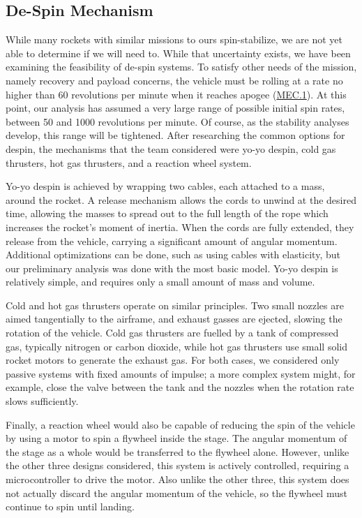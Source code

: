 \subsection{De-Spin Mechanism}
While many rockets with similar missions to ours spin-stabilize, we are not yet able to determine if we will need to. While that uncertainty exists, we have been examining the feasibility of de-spin systems. To satisfy other needs of the mission, namely recovery and payload concerns, the vehicle must be rolling at a rate no higher than 60 revolutions per minute when it reaches apogee (\hyperlink{MEC.1}{MEC.1}). At this point, our analysis has assumed a very large range of possible initial spin rates, between 50 and 1000 revolutions per minute. Of course, as the stability analyses develop, this range will be tightened. After researching the common options for despin, the mechanisms that the team considered were yo-yo despin, cold gas thrusters, hot gas thrusters, and a reaction wheel system.

Yo-yo despin is achieved by wrapping two cables, each attached to a mass, around the rocket. A release mechanism allows the cords to unwind at the desired time, allowing the masses to spread out to the full length of the rope which increases the rocket’s moment of inertia. When the cords are fully extended, they release from the vehicle, carrying a significant amount of angular momentum. Additional optimizations can be done, such as using cables with elasticity, but our preliminary analysis was done with the most basic model. Yo-yo despin is relatively simple, and requires only a small amount of mass and volume.

Cold and hot gas thrusters operate on similar principles. Two small nozzles are aimed tangentially to the airframe, and exhaust gasses are ejected, slowing the rotation of the vehicle. Cold gas thrusters are fuelled by a tank of compressed gas, typically nitrogen or carbon dioxide, while hot gas thrusters use small solid rocket motors to generate the exhaust gas. For both cases, we considered only passive systems with fixed amounts of impulse; a more complex system might, for example, close the valve between the tank and the nozzles when the rotation rate slows sufficiently.

Finally, a reaction wheel would also be capable of reducing the spin of the vehicle by using a motor to spin a flywheel inside the stage. The angular momentum of the stage as a whole would be transferred to the flywheel alone. However, unlike the other three designs considered, this system is actively controlled, requiring a microcontroller to drive the motor. Also unlike the other three, this system does not actually discard the angular momentum of the vehicle, so the flywheel must continue to spin until landing.

